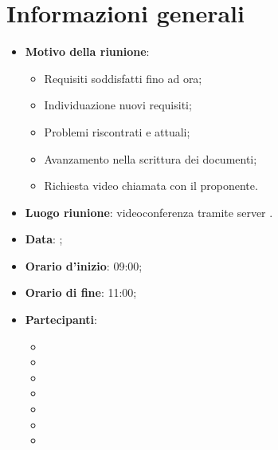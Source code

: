 \section{Informazioni generali}
\begin{itemize}
\item \textbf{Motivo della riunione}: 
\begin{itemize}
	\item Requisiti soddisfatti fino ad ora;
	\item Individuazione nuovi requisiti;
	\item Problemi riscontrati e attuali;
	\item Avanzamento nella scrittura dei documenti;
	\item Richiesta video chiamata con il proponente.
\end{itemize}
\item \textbf{Luogo riunione}: videoconferenza tramite server .
\item \textbf{Data}: \Data{};
\item \textbf{Orario d'inizio}: 09:00;
\item \textbf{Orario di fine}: 11:00;
\item \textbf{Partecipanti}:
	\begin{itemize}
	\item \BM{}
	\item \SG{}
	\item \SP{}
	\item \SH{}
	\item \PA{}
	\item \ZM{}
	\item \RA{}
	\end{itemize}
\end{itemize}

\newpage
